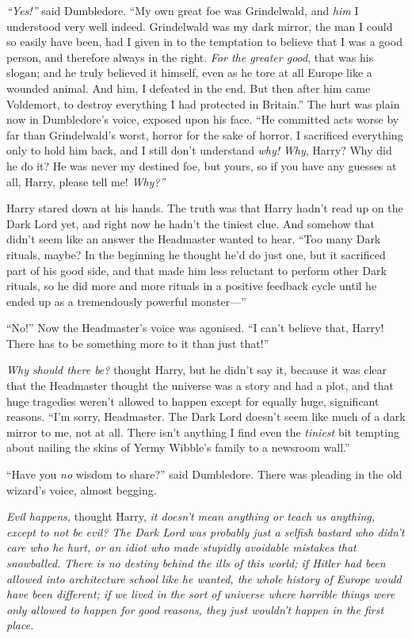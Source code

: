 \emph{``Yes!''} said Dumbledore. ``My own great foe was Grindelwald, and
\emph{him} I understood very well indeed. Grindelwald was my dark
mirror, the man I could so easily have been, had I given in to the
temptation to believe that I was a good person, and therefore always in
the right. \emph{For the greater good}, that was his slogan; and he
truly believed it himself, even as he tore at all Europe like a wounded
animal. And him, I defeated in the end. But then after him came
Voldemort, to destroy everything I had protected in Britain.'' The hurt
was plain now in Dumbledore's voice, exposed upon his face. ``He
committed acts worse by far than Grindelwald's worst, horror for the
sake of horror. I sacrificed everything only to hold him back, and I
still don't understand \emph{why!} \emph{Why}, Harry? Why did he do it?
He was never my destined foe, but yours, so if you have any guesses at
all, Harry, please tell me! \emph{Why?''}

Harry stared down at his hands. The truth was that Harry hadn't read up
on the Dark Lord yet, and right now he hadn't the tiniest clue. And
somehow that didn't seem like an answer the Headmaster wanted to hear.
``Too many Dark rituals, maybe? In the beginning he thought he'd do just
one, but it sacrificed part of his good side, and that made him less
reluctant to perform other Dark rituals, so he did more and more rituals
in a positive feedback cycle until he ended up as a tremendously
powerful monster---''

``No!'' Now the Headmaster's voice was agonised. ``I can't believe that,
Harry! There has to be something more to it than just that!''

\emph{Why should there be?} thought Harry, but he didn't say it, because
it was clear that the Headmaster thought the universe was a story and
had a plot, and that huge tragedies weren't allowed to happen except for
equally huge, significant reasons. ``I'm sorry, Headmaster. The Dark
Lord doesn't seem like much of a dark mirror to me, not at all. There
isn't anything I find even the \emph{tiniest} bit tempting about nailing
the skins of Yermy Wibble's family to a newsroom wall.''

``Have you \emph{no} wisdom to share?'' said Dumbledore. There was
pleading in the old wizard's voice, almost begging.

\emph{Evil happens,} thought Harry, \emph{it doesn't mean anything or
teach us anything, except to not be evil? The Dark Lord was probably
just a selfish bastard who didn't care who he hurt, or an idiot who made
stupidly avoidable mistakes that snowballed. There is no destiny behind
the ills of this world; if Hitler had been allowed into architecture
school like he wanted, the whole history of Europe would have been
different; if we lived in the sort of universe where horrible things
were only allowed to happen for good reasons, they just wouldn't happen
in the first place.}

